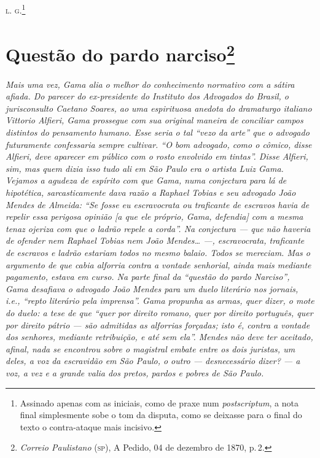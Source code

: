 \textsc{l. g.}\footnote{ Assinado apenas com as iniciais, como de praxe num
  \emph{postscriptum}, a nota final simplesmente sobe o tom da disputa,
  como se deixasse para o final do texto o contra-ataque mais incisivo.}

\chapter{Questão do pardo narciso\footnote{\emph{Correio Paulistano} (\textsc{sp}), A Pedido, 04 de dezembro de 1870,
  p.\,2.}} %

\begin{didascalia}
\emph{Mais uma vez, Gama alia o melhor do conhecimento normativo com a
sátira afiada. Do parecer do ex-presidente do Instituto dos Advogados do
Brasil, o jurisconsulto Caetano Soares, ao uma espirituosa anedota do
dramaturgo italiano Vittorio Alfieri, Gama prossegue com sua original
maneira de conciliar campos distintos do pensamento humano. Esse seria o
tal ``vezo da arte'' que o advogado futuramente confessaria sempre
cultivar. ``O bom advogado, como o cômico, disse Alfieri, deve aparecer
em público com o rosto envolvido em tintas''. Disse Alfieri, sim, mas
quem dizia isso tudo ali em São Paulo era o artista Luiz Gama. Vejamos a
agudeza de espírito com que Gama, numa conjectura para lá de hipotética,
sarcasticamente dava razão a Raphael Tobias e seu advogado João Mendes
de Almeida: ``Se fosse eu escravocrata ou traficante de escravos havia de
repelir essa perigosa opinião {[}a que ele próprio, Gama, defendia{]}
com a mesma tenaz ojeriza com que o ladrão repele a corda''. Na
conjectura --- que não haveria de ofender nem Raphael Tobias nem João
Mendes\ldots{} ---, escravocrata, traficante de escravos e ladrão estariam
todos no mesmo balaio. Todos se mereciam. Mas o argumento de que cabia
alforria contra a vontade senhorial, ainda mais mediante pagamento,
estava em curso. Na parte final da ``questão do pardo Narciso'', Gama
desafiava o advogado João Mendes para um duelo literário nos jornais,
i.e., ``repto literário pela imprensa''. Gama propunha as armas, quer
dizer, o mote do duelo: a tese de que ``quer por direito romano, quer por
direito português, quer por direito pátrio --- são admitidas as
alforrias forçadas; isto é, contra a vontade dos senhores, mediante
retribuição, e até sem ela''. Mendes não deve ter aceitado, afinal, nada
se encontrou sobre o magistral embate entre os dois juristas, um deles,
a voz da escravidão em São Paulo, o outro --- desnecessário dizer? --- a
voz, a vez e a grande valia dos pretos, pardos e pobres de São Paulo.}
\end{didascalia}

